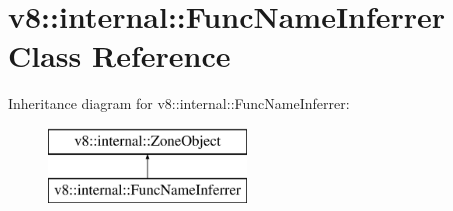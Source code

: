 \hypertarget{classv8_1_1internal_1_1_func_name_inferrer}{}\section{v8\+:\+:internal\+:\+:Func\+Name\+Inferrer Class Reference}
\label{classv8_1_1internal_1_1_func_name_inferrer}
Inheritance diagram for v8\+:\+:internal\+:\+:Func\+Name\+Inferrer\+:\begin{figure}[H]
\begin{center}
\leavevmode
\includegraphics[height=2.000000cm]{classv8_1_1internal_1_1_func_name_inferrer}
\end{center}
\end{figure}

